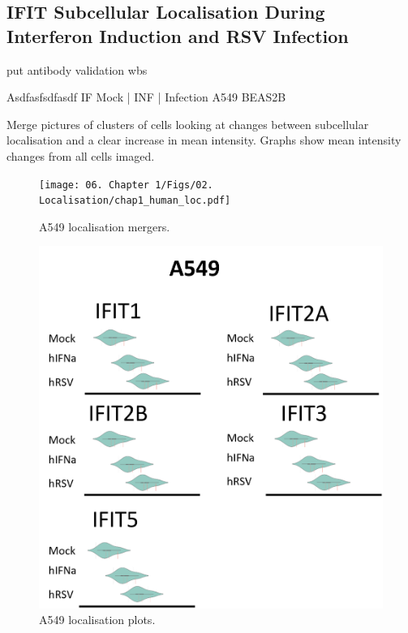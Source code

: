 \subsection{IFIT Subcellular Localisation During Interferon Induction and RSV Infection} \label{subsec:IFIT Subcellular Localisation During Interferon INduction and RSV Infection}
put antibody validation wbs


Asdfasfsdfasdf \newline
IF Mock | INF | Infection \newline
A549 BEAS2B

Merge pictures of clusters of cells looking at changes between subcellular localisation and a clear increase in mean intensity. Graphs show mean intensity changes from all cells imaged.

\begin{figure}
    \centering
    \texttt{[image: 06. Chapter 1/Figs/02. Localisation/chap1\_human\_loc.pdf]}
    \caption[A549 localisation mergers.]{A549 localisation mergers.}
    \label{fig:A549 localisation mergers.}
\end{figure}


\begin{figure}
    \centering
    \includegraphics[width=1\linewidth]{06. Chapter 1/Figs/02. Localisation/02. a549 plots.png}
    \caption[A549 localisation plots.]{A549 localisation plots.}
    \label{fig:A549 localisation plots.}
\end{figure}




